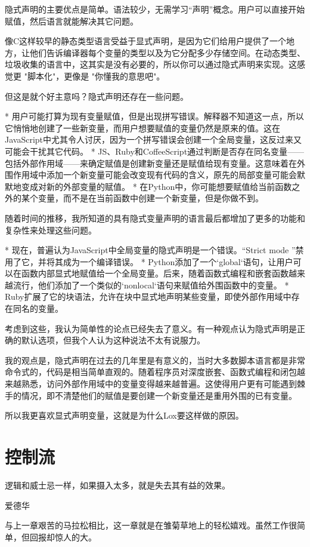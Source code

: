 \documentclass[cn,11pt,chinese]{elegantbook}
\begin{document}
隐式声明的主要优点是简单。语法较少，无需学习“声明”概念。用户可以直接开始赋值，然后语言就能解决其它问题。

像C这样较早的静态类型语言受益于显式声明，是因为它们给用户提供了一个地方，让他们告诉编译器每个变量的类型以及为它分配多少存储空间。在动态类型、垃圾收集的语言中，这其实是没有必要的，所以你可以通过隐式声明来实现。这感觉更 "脚本化"，更像是 "你懂我的意思吧"。

但这是就个好主意吗？隐式声明还存在一些问题。

* 用户可能打算为现有变量赋值，但是出现拼写错误。解释器不知道这一点，所以它悄悄地创建了一些新变量，而用户想要赋值的变量仍然是原来的值。这在JavaScript中尤其令人讨厌，因为一个拼写错误会创建一个全局变量，这反过来又可能会干扰其它代码。
* JS、Ruby和CoffeeScript通过判断是否存在同名变量——包括外部作用域——来确定赋值是创建新变量还是赋值给现有变量。这意味着在外围作用域中添加一个新变量可能会改变现有代码的含义，原先的局部变量可能会默默地变成对新的外部变量的赋值。
* 在Python中，你可能想要赋值给当前函数之外的某个变量，而不是在当前函数中创建一个新变量，但是你做不到。

随着时间的推移，我所知道的具有隐式变量声明的语言最后都增加了更多的功能和复杂性来处理这些问题。

* 现在，普遍认为JavaScript中全局变量的隐式声明是一个错误。“Strict mode ”禁用了它，并将其成为一个编译错误。
* Python添加了一个`global`语句，让用户可以在函数内部显式地赋值给一个全局变量。后来，随着函数式编程和嵌套函数越来越流行，他们添加了一个类似的`nonlocal`语句来赋值给外围函数中的变量。
* Ruby扩展了它的块语法，允许在块中显式地声明某些变量，即使外部作用域中存在同名的变量。

考虑到这些，我认为简单性的论点已经失去了意义。有一种观点认为隐式声明是正确的默认选项，但我个人认为这种说法不太有说服力。

我的观点是，隐式声明在过去的几年里是有意义的，当时大多数脚本语言都是非常命令式的，代码是相当简单直观的。随着程序员对深度嵌套、函数式编程和闭包越来越熟悉，访问外部作用域中的变量变得越来越普遍。这使得用户更有可能遇到棘手的情况，即不清楚他们的赋值是要创建一个新变量还是重用外围的已有变量。

所以我更喜欢显式声明变量，这就是为什么Lox要这样做的原因。

\chapter{控制流}

\epigraph{逻辑和威士忌一样，如果摄入太多，就是失去其有益的效果。}{爱德华}

与上一章艰苦的马拉松相比，这一章就是在雏菊草地上的轻松嬉戏。虽然工作很简单，但回报却惊人的大。
\end{document}
